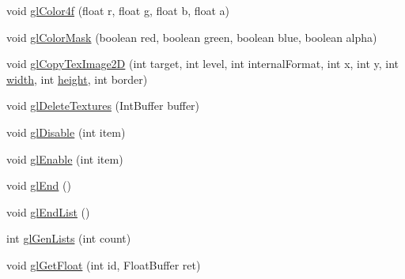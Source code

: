 \begin{DoxyCompactItemize}
\item 
void \mbox{\hyperlink{classorg_1_1newdawn_1_1slick_1_1opengl_1_1renderer_1_1_immediate_mode_o_g_l_renderer_afad98c65defdaa9753efabd4e9747cb5}{gl\+Color4f}} (float r, float g, float b, float a)
\item 
void \mbox{\hyperlink{classorg_1_1newdawn_1_1slick_1_1opengl_1_1renderer_1_1_immediate_mode_o_g_l_renderer_a451ffce8749614d627ef560ed3988b18}{gl\+Color\+Mask}} (boolean red, boolean green, boolean blue, boolean alpha)
\item 
void \mbox{\hyperlink{classorg_1_1newdawn_1_1slick_1_1opengl_1_1renderer_1_1_immediate_mode_o_g_l_renderer_ac06c5062e5983c702f01cf67a5ec2d1c}{gl\+Copy\+Tex\+Image2D}} (int target, int level, int internal\+Format, int x, int y, int \mbox{\hyperlink{classorg_1_1newdawn_1_1slick_1_1opengl_1_1renderer_1_1_immediate_mode_o_g_l_renderer_a65d0a04d747368ea954f69074d9102d6}{width}}, int \mbox{\hyperlink{classorg_1_1newdawn_1_1slick_1_1opengl_1_1renderer_1_1_immediate_mode_o_g_l_renderer_aec68994a0ee3b7b478122af823c8a8d7}{height}}, int border)
\item 
void \mbox{\hyperlink{classorg_1_1newdawn_1_1slick_1_1opengl_1_1renderer_1_1_immediate_mode_o_g_l_renderer_a34a5863e766c0b3698ff867c9fa1ab98}{gl\+Delete\+Textures}} (Int\+Buffer buffer)
\item 
void \mbox{\hyperlink{classorg_1_1newdawn_1_1slick_1_1opengl_1_1renderer_1_1_immediate_mode_o_g_l_renderer_a98084664d41997626872ebedb5d76474}{gl\+Disable}} (int item)
\item 
void \mbox{\hyperlink{classorg_1_1newdawn_1_1slick_1_1opengl_1_1renderer_1_1_immediate_mode_o_g_l_renderer_ac8ffe84c76858531fd8c872bef726bb9}{gl\+Enable}} (int item)
\item 
void \mbox{\hyperlink{classorg_1_1newdawn_1_1slick_1_1opengl_1_1renderer_1_1_immediate_mode_o_g_l_renderer_aed3061aaf4d048fe00f25d191974b0f3}{gl\+End}} ()
\item 
void \mbox{\hyperlink{classorg_1_1newdawn_1_1slick_1_1opengl_1_1renderer_1_1_immediate_mode_o_g_l_renderer_a2896ef315ccd6ee04732a3f8c717ffc1}{gl\+End\+List}} ()
\item 
int \mbox{\hyperlink{classorg_1_1newdawn_1_1slick_1_1opengl_1_1renderer_1_1_immediate_mode_o_g_l_renderer_af14eac568c10241542cceb2df678e91d}{gl\+Gen\+Lists}} (int count)
\item 
void \mbox{\hyperlink{classorg_1_1newdawn_1_1slick_1_1opengl_1_1renderer_1_1_immediate_mode_o_g_l_renderer_a35802bb8ba68a4426b89edb0fd3aaa91}{gl\+Get\+Float}} (int id, Float\+Buffer ret)

\end{DoxyCompactItemize}
